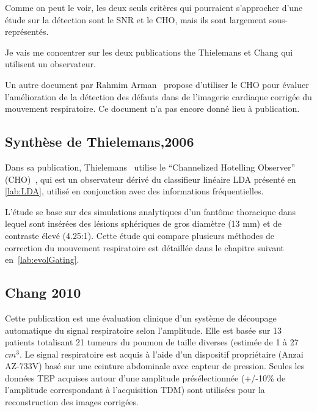 Comme on peut le voir, les deux seuls critères qui pourraient s'approcher d'une étude sur la détection sont le SNR et le CHO, mais ils sont largement sous-représentés. 

Je vais me concentrer sur les deux publications the Thielemans et Chang qui utilisent un observateur.

Un autre document par Rahmim Arman~\cite{rahmim4d} propose d'utiliser le CHO pour évaluer l'amélioration de la détection des défauts dans de l'imagerie cardiaque corrigée du mouvement respiratoire. Ce document n'a pas encore donné lieu à publication.
	
\subsection{Synthèse de Thielemans,2006}

Dans sa publication, Thielemans~\cite{Thielemans2006Lesion} utilise le ``Channelized Hotelling Observer'' (CHO)~\cite{barrett1993model}, qui est un observateur dérivé du classifieur linéaire LDA présenté en \ref{lab:LDA}, utilisé en conjonction avec des informations fréquentielles. 

L'étude se base sur des simulations analytiques d'un fantôme thoracique dans lequel sont insérées des lésions sphériques de gros diamètre (13 mm) et de contraste élevé (4.25:1). Cette étude qui compare plusieurs méthodes de correction du mouvement respiratoire est détaillée dans le chapitre suivant en~\ref{lab:evolGating}.







\subsection{Chang 2010}

Cette publication est une évaluation clinique d'un système de découpage automatique du signal respiratoire selon l'amplitude. Elle est basée sur 13 patients totalisant 21 tumeurs du poumon de taille diverses (estimée de 1 à 27 $cm^3$. Le signal respiratoire est acquis à l'aide d'un dispositif propriétaire (Anzai AZ-733V) basé sur une ceinture abdominale avec capteur de pression. Seules les données TEP acquises autour d'une amplitude présélectionnée (+/-10\% de l'amplitude correspondant à l'acquisition TDM) sont utilisées pour la reconstruction des images corrigées. 

